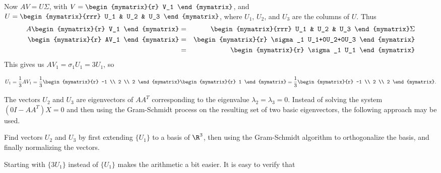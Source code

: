 \begin{solution}
Now $AV=U\Sigma$, with
$V=\begin{mymatrix}{r} V_1 \end{mymatrix}$,
and $U=\begin{mymatrix}{rrr} U_1 & U_2 & U_3 \end{mymatrix}$,
where $U_1$, $U_2$, and $U_3$ are the columns of $U$.
Thus
\begin{eqnarray*}
A\begin{mymatrix}{r} V_1 \end{mymatrix}
&=& \begin{mymatrix}{rrr} U_1 & U_2 & U_3 \end{mymatrix}\Sigma\\
\begin{mymatrix}{r} AV_1 \end{mymatrix}
&=& \begin{mymatrix}{r} \sigma_1 U_1+0U_2+0U_3 \end{mymatrix}\\
&=& \begin{mymatrix}{r} \sigma_1 U_1 \end{mymatrix}
\end{eqnarray*}
This gives us $AV_1=\sigma_1 U_1= 3U_1$, so

\[ U_1 = \frac{1}{3}AV_1 
= \frac{1}{3}
\begin{mymatrix}{r} -1 \\ 2 \\ 2 \end{mymatrix}
\begin{mymatrix}{r} 1 \end{mymatrix}
= \frac{1}{3}
\begin{mymatrix}{r} -1 \\ 2 \\ 2 \end{mymatrix}.\]

The vectors $U_2$ and $U_3$ are eigenvectors of $AA^T$ corresponding
to the eigenvalue $\lambda_2=\lambda_3=0$.
Instead of solving the system $(0I-AA^T)X= 0$ and then using the
Gram-Schmidt process on the resulting set of
two basic eigenvectors, the following approach may be used.


Find vectors $U_2$ and $U_3$ by first extending $\{U_1\}$ to a basis of
$\R^3$, then using the Gram-Schmidt algorithm to orthogonalize the basis,
and finally normalizing the vectors.

Starting with $\{3U_1\}$ instead of $\{U_1\}$ makes the
arithmetic a bit easier.
It is easy to verify that


\end{solution}
